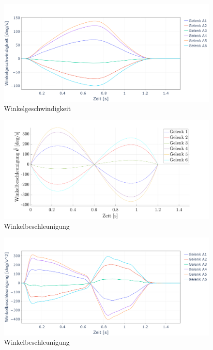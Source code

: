 %
\begin{figure}[]
	\centering
	\includegraphics[width=1\linewidth]{images/winkelgeschwindigkeit_py}
	\caption{Winkelgeschwindigkeit}
	\label{fig:winkelgeschwindigkeit_py1}
\end{figure}
%
\newpage
\begin{figure}[]
	\centering
	\includegraphics[width=1\linewidth]{images/winkelbeschleunigung}
	\caption{Winkelbeschleunigung}
	\label{fig:winkelbeschleunigung}
\end{figure}
%
\begin{figure}[]
	\centering
	\includegraphics[width=1\linewidth]{images/winkelbeschleunigung_py1}
	\caption{Winkelbeschleunigung}
	\label{fig:winkelbeschleunigung_py}
\end{figure}
